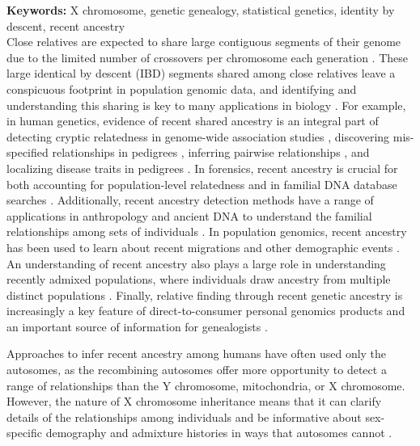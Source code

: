 \documentclass[11pt]{article}
\begin{document}
{\small {\bf Keywords:} X chromosome, genetic genealogy, statistical genetics, identity by descent, recent ancestry}\\[1em]

Close relatives are expected to share large contiguous segments of their genome
due to the limited number of crossovers per chromosome each generation
\citep{fisher1949theory,fisher1954fuller,Donnelly:1983fi}. These large
identical by descent (IBD) segments shared among close relatives leave a
conspicuous footprint in population genomic data, and identifying and
understanding this sharing is key to many applications in biology
\citep{thompson2013identity}. For example, in human genetics, evidence of
recent shared ancestry is an integral part of detecting cryptic relatedness in
genome-wide association studies \citep{gusev2009whole}, discovering
mis-specified relationships in pedigrees \citep{sun2002enhanced}, inferring
pairwise relationships \citep{Epstein:2000bg, glaubitz2003prospects,
huff2011maximum}, and localizing disease traits in pedigrees
\citep{thomas2008shared}. In forensics, recent ancestry is crucial for both
accounting for population-level relatedness \citep{balding1994dna} and in
familial DNA database searches \citep{belin1997summarizing,
sjerps1999consequences}. Additionally, recent ancestry detection methods have a
range of applications in anthropology and ancient DNA to understand the
familial relationships among sets of individuals
\citep{Fu:2015bl,keyser2003nuclear,baca2012ancient,haak2008ancient}. In
population genomics, recent ancestry has been used to learn about recent
migrations and other demographic events
\citep{ralphcoop2013,palamara2012length}. An understanding of recent ancestry
also plays a large role in understanding recently admixed populations, where
individuals draw ancestry from multiple distinct populations
\citep{pool2009inference,Gravel:2012ip,liang2014lengths}. Finally, relative finding
through recent genetic ancestry is increasingly a key feature of
direct-to-consumer personal genomics products and an important source of
information for genealogists \citep{Durand010512,royal2010inferring}. 

Approaches to infer recent ancestry among humans have often used only the
autosomes, as the recombining autosomes offer more opportunity to detect a
range of relationships than the Y chromosome, mitochondria, or X chromosome.
However, the nature of X chromosome inheritance means that it can clarify
details of the relationships among individuals and be informative about
sex-specific demography and admixture histories in ways that autosomes cannot
\citep{Goldberg:2015ja,ramachandran2004robustness,
ramachandran2008population,bryc2010genome,Bustamante:2009gp,Shringarpure039347,pool2007population}.
\end{document}
